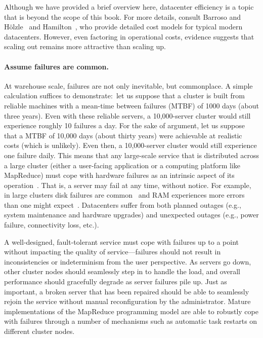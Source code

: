 Although we have provided a brief overview here, datacenter efficiency
is a topic that is beyond the scope of this book.  For more details,
consult Barroso and H\"{o}lzle~\cite{Barroso_Holzle_2009} and
Hamilton~\cite{Hamilton_2009}, who provide detailed cost models for
typical modern datacenters.  However, even factoring in operational
costs, evidence suggests that scaling out remains more attractive than
scaling up.

\paragraph{Assume failures are common.} 
At warehouse scale, failures are not only inevitable, but commonplace.
A simple calculation suffices to demonstrate:\ let us suppose that a
cluster is built from reliable machines with a mean-time between
failures (MTBF) of 1000 days (about three years).  Even with these
reliable servers, a 10,000-server cluster would still experience
roughly 10 failures a day.  For the sake of argument, let us suppose
that a MTBF of 10,000 days (about thirty years) were achievable at
realistic costs (which is unlikely).  Even then, a 10,000-server
cluster would still experience one failure daily.  This means that any
large-scale service that is distributed across a large cluster (either
a user-facing application or a computing platform like MapReduce) must
cope with hardware failures as an intrinsic aspect of its
operation~\cite{Hamilton_2007}.  That is, a server may fail at any
time, without notice.  For example, in large clusters disk failures
are common~\cite{Pinheiro_etal_2007} and RAM experiences more errors
than one might expect~\cite{Schroeder_etal_2009}.  Datacenters suffer
from both planned outages (e.g., system maintenance and hardware
upgrades) and unexpected outages (e.g., power failure, connectivity
loss, etc.).

A well-designed, fault-tolerant service must cope with failures up to
a point without impacting the quality of service---failures should not
result in inconsistencies or indeterminism from the user perspective.
As servers go down, other cluster nodes should seamlessly step in to
handle the load, and overall performance should gracefully degrade as
server failures pile up.  Just as important, a broken server that has
been repaired should be able to seamlessly rejoin the service without
manual reconfiguration by the administrator.  Mature implementations of
the MapReduce programming model are able to robustly cope with
failures through a number of mechanisms such as automatic task
restarts on different cluster nodes.

